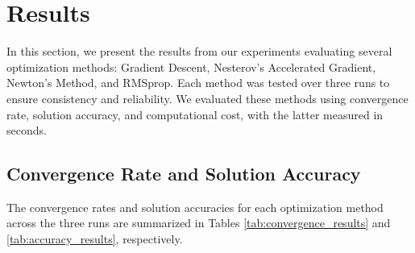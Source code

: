 \documentclass[11pt]{article}
\begin{document}
\section{Results}

In this section, we present the results from our experiments evaluating several optimization methods: Gradient Descent, Nesterov's Accelerated Gradient, Newton's Method, and RMSprop. Each method was tested over three runs to ensure consistency and reliability. We evaluated these methods using convergence rate, solution accuracy, and computational cost, with the latter measured in seconds.

\subsection{Convergence Rate and Solution Accuracy}

The convergence rates and solution accuracies for each optimization method across the three runs are summarized in Tables \ref{tab:convergence_results} and \ref{tab:accuracy_results}, respectively.


\begin{table}[h]
 \centering
 \caption{Convergence rates of different optimization methods over three runs.}
 \label{tab:convergence_results}
\end{table}



\begin{table}[h]
 \centering
 \caption{Final solution accuracy of different optimization methods over three runs.}
 \label{tab:accuracy_results}
\end{table}
\end{document}
